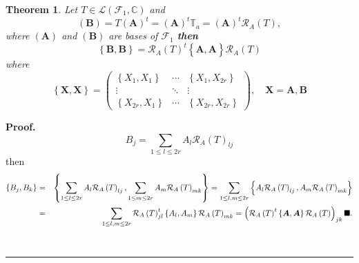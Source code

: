 \documentclass[aps,preprint]{revtex4}
\newtheorem{theorem}{Theorem}
\newenvironment{proof}[1][Proof]{\noindent\textbf{#1.} }{\ \rule{0.5em}{0.5em}}
\begin{document}
\begin{theorem}
\label{CAR Theorem} Let $T\in \mathcal{L}\left( \mathcal{F}_{1},\mathbb{C}%
\right) $ and 
\begin{equation}
\left( \boldsymbol{B}\right) =T\left( \boldsymbol{A}\right) ^{t}=\left( 
\mathbf{A}\right) ^{t}\mathbb{T}_{a}=\left( \mathbf{A}\right) ^{t}\mathcal{R}%
_{A}\left( T\right) ,
\end{equation}%
where $\left( \mathbf{A}\right) $ and $\left( \mathbf{B}\right) $ are bases
of $\mathcal{F}_{1}$ \textbf{then} 
\begin{equation}
\left\{ \boldsymbol{B},\boldsymbol{B}\right\} =\mathcal{R}_{A}\left(
T\right) ^{t}\left\{ \overset{}{\boldsymbol{A},\boldsymbol{A}}\right\} 
\mathcal{R}_{A}\left( T\right)
\end{equation}%
where 
\begin{equation}
\left\{ \boldsymbol{X},\boldsymbol{X}\right\} =\left( 
\begin{array}{ccc}
\left\{ X_{1},X_{1}\right\} & \cdots & \left\{ X_{1},X_{2r}\right\} \\ 
\vdots & \ddots & \vdots \\ 
\left\{ X_{2r},X_{1}\right\} & \cdots & \left\{ X_{2r},X_{2r}\right\}%
\end{array}%
\right) ,\quad \boldsymbol{X=A},\boldsymbol{B}
\end{equation}
\end{theorem}

\begin{proof}
\begin{equation}
B_{j}=\sum_{1\leq l\leq 2r}A_{l}\mathcal{R}_{A}\left( T\right) _{lj}
\end{equation}%
then 
\begin{eqnarray*}
\left\{ B_{j},B_{k}\right\} &=&\left\{ \sum_{1\leq l\leq 2r}A_{l}\mathcal{R}%
_{A}\left( T\right) _{lj},\sum_{1\leq m\leq 2r}A_{m}\mathcal{R}_{A}\left(
T\right) _{mk}\right\} =\sum_{1\leq l,m\leq 2r}\left\{ A_{l}\mathcal{R}%
_{A}\left( T\right) _{lj},A_{m}\mathcal{R}_{A}\left( T\right) _{mk}\right\}
\\
&=&\sum_{1\leq l,m\leq 2r}\mathcal{R}_{A}\left( T\right) _{jl}^{t}\left\{
A_{l},A_{m}\right\} \mathcal{R}_{A}\left( T\right) _{mk}=\left( \overset{}{%
\mathcal{R}_{A}\left( T\right) ^{t}\left\{ \boldsymbol{A},\boldsymbol{A}%
\right\} \mathcal{R}_{A}\left( T\right) }\right) _{jk}\blacksquare .
\end{eqnarray*}
\end{proof}
\end{document}
